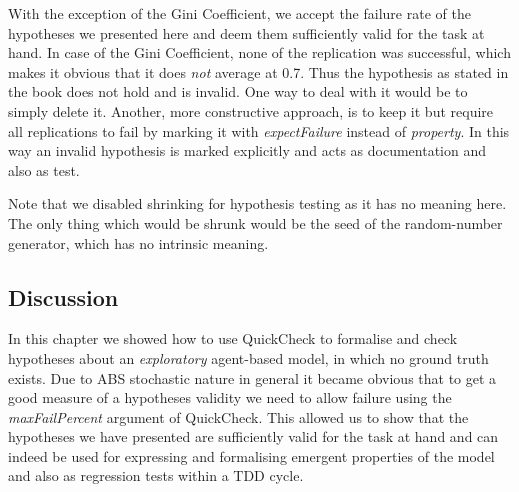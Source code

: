 With the exception of the Gini Coefficient, we accept the failure rate of the hypotheses we presented here and deem them sufficiently valid for the task at hand. In case of the Gini Coefficient, none of the replication was successful, which makes it obvious that it does \textit{not} average at 0.7. Thus the hypothesis as stated in the book does not hold and is invalid. One way to deal with it would be to simply delete it. Another, more constructive approach, is to keep it but require all replications to fail by marking it with \textit{expectFailure} instead of \textit{property}. In this way an invalid hypothesis is marked explicitly and acts as documentation and also as test.

Note that we disabled shrinking for hypothesis testing as it has no meaning here. The only thing which would be shrunk would be the seed of the random-number generator, which has no intrinsic meaning.

\subsection{Discussion}
In this chapter we showed how to use QuickCheck to formalise and check hypotheses about an \textit{exploratory} agent-based model, in which no ground truth exists. Due to ABS stochastic nature in general it became obvious that to get a good measure of a hypotheses validity we need to allow failure using the \textit{maxFailPercent} argument of QuickCheck. This allowed us to show that the hypotheses we have presented are sufficiently valid for the task at hand and can indeed be used for expressing and formalising emergent properties of the model and also as regression tests within a TDD cycle.